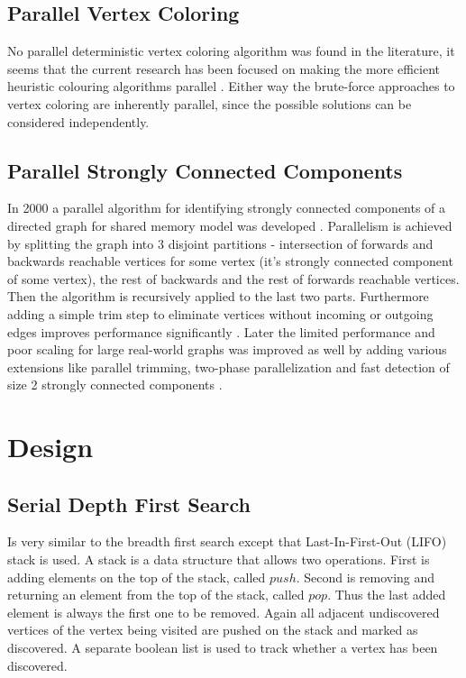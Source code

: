 \documentclass{report}
\theoremstyle{plain}
\theoremstyle{definition}
\theoremstyle{remark}
\begin{document}
\section{Parallel Vertex Coloring}

No parallel deterministic vertex coloring algorithm was found in the literature, it seems that the current research has been focused on making the more efficient heuristic colouring algorithms parallel \cite{gebremedhin1999parallel, gebremedhin2000scalable, jones1993parallel}. Either way the brute-force approaches to vertex coloring are inherently parallel, since the possible solutions can be considered independently.

\section{Parallel Strongly Connected Components}

In 2000 a parallel algorithm for identifying strongly connected components of a directed graph for shared memory model was developed \cite{fleischer2000identifying}. Parallelism is achieved by splitting the graph into 3 disjoint partitions - intersection of forwards and backwards reachable vertices for some vertex (it's strongly connected component of some vertex), the rest of backwards and the rest of forwards reachable vertices. Then the algorithm is recursively applied to the last two parts. Furthermore adding a simple trim step to eliminate vertices without incoming or outgoing edges improves performance significantly \cite{mclendon2005finding}. Later the limited performance and poor scaling for large real-world graphs was improved as well by adding various extensions like parallel trimming, two-phase parallelization and fast detection of size 2 strongly connected components \cite{hongtechnical}.

\chapter{Design}

\section{Serial Depth First Search}

Is very similar to the breadth first search except that Last-In-First-Out (LIFO) stack is used. A stack is a data structure that allows two operations. First is adding elements on the top of the stack, called $push$. Second is removing and returning an element from the top of the stack, called $pop$. Thus the last added element is always the first one to be removed. Again all adjacent undiscovered vertices of the vertex being visited are pushed on the stack and marked as discovered. A separate boolean list is used to track whether a vertex has been discovered.
\end{document}
